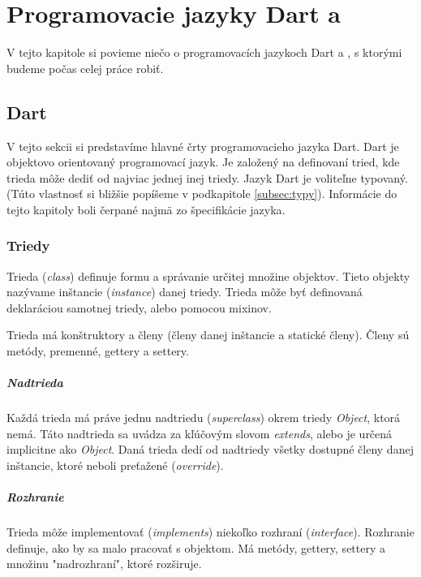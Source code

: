 \chapter{Programovacie jazyky Dart a \JS{}}

\label{kap:jazyky} %

V tejto kapitole si povieme niečo o programovacích jazykoch Dart a \JS{}, s ktorými budeme počas celej práce robiť.

\section{Dart}
\label{sec:dart}
V tejto sekcii si predstavíme hlavné črty programovacieho jazyka Dart. Dart je objektovo orientovaný programovací jazyk. Je založený na definovaní tried, kde trieda môže dediť od najviac jednej inej triedy. 
Jazyk Dart je voliteľne typovaný. (Túto vlastnosť si bližšie popíšeme v podkapitole \ref{subsec:typy}). 
Informácie do tejto kapitoly boli čerpané najmä zo špecifikácie jazyka\cite{DartLanguage}.

\subsection{Triedy}
Trieda (\emph{class}) definuje formu a správanie určitej množine objektov. Tieto objekty nazývame inštancie (\emph{instance}) danej triedy. 
Trieda môže byť definovaná deklaráciou samotnej triedy, alebo pomocou mixinov.

Trieda má konštruktory a členy (členy danej inštancie a statické členy). Členy sú metódy, premenné, gettery a settery. 

\paragraph{Nadtrieda}
Každá trieda má práve jednu nadtriedu (\emph{superclass}) okrem triedy \emph{Object}, ktorá nemá. Táto nadtrieda sa uvádza za kľúčovým slovom \emph{extends}, alebo je určená implicitne ako \emph{Object}. %
Daná trieda dedí od nadtriedy všetky dostupné členy danej inštancie, ktoré neboli preťažené (\emph{override}).

\paragraph{Rozhranie}
Trieda môže implementovať (\emph{implements}) niekoľko rozhraní (\emph{interface}). Rozhranie definuje, ako by sa malo pracovať s objektom. 
Má metódy, gettery, settery a množinu "nadrozhraní", ktoré rozširuje.

